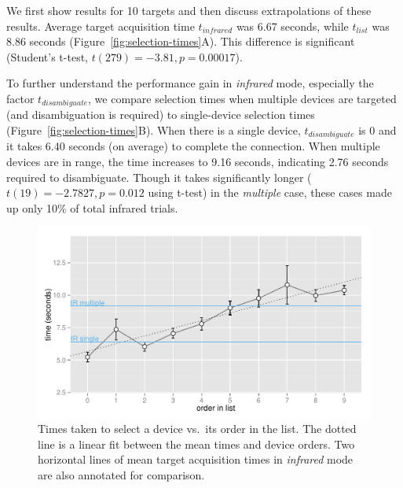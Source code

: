 We first show results for 10 targets and then discuss extrapolations of these results. Average target acquisition time $t_{infrared}$ was 6.67 seconds, while $t_{list}$ was 8.86 seconds (Figure~\ref{fig:selection-times}A). This difference is significant (Student's t-test, $t(279)=-3.81, p=0.00017$). %

To further understand the performance gain in {\em infrared} mode, especially the factor $t_{disambiguate}$, we compare selection times when multiple devices are targeted (and disambiguation is required) to single-device selection times (Figure~\ref{fig:selection-times}B). When there is a single device, $t_{disambiguate}$ is 0 and it takes 6.40 seconds (on average) to complete the connection. When multiple devices are in range, the time increases to 9.16 seconds, indicating 2.76 seconds required to disambiguate. Though it takes significantly longer ($t(19)=-2.7827, p=0.012$ using t-test) in the {\em multiple} case, these cases made up only 10\% of total infrared trials.

\begin{figure}[t]
\centering
\includegraphics[width=1.0\columnwidth]{figures/R_List_by_Target.pdf}
\caption{Times taken to select a device vs.~its order in the list. The dotted line is a linear fit between the mean times and device orders. Two horizontal lines of mean target acquisition times in {\em infrared} mode are also annotated for comparison.}
\label{fig:time-vs-list-order}
\end{figure}

